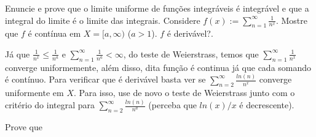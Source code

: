 \documentclass[11pt]{exam}
\begin{document}
\begin{questions}
 \question[20] Enuncie e prove que o limite uniforme de funções integráveis é integrável e que a integral do limite é o limite das integrais.
  \question[20] Considere $f(x):=\sum_{n=1}^{\infty}\frac{1}{n^x}$. Mostre que $f$ é contínua em $X=[a,\infty)$ ($a>1$). $f$ é derivável?.
  \begin{solution}
  Já que $\frac{1}{n^x}\leq \frac{1}{n^a}$ e $\sum_{n=1}^{\infty}\frac{1}{n^a}< \infty$, do teste de Weierstrass, temos que 
  $\sum_{n=1}^{\infty}\frac{1}{n^x}$ converge uniformemente, além disso, dita função é continua
  já que cada somando é contínuo. Para verificar que é derivável basta 
  ver se $\sum_{n=2}^{\infty}\frac{ln(n)}{n^x}$ converge uniformente em $X$. Para isso, use de novo o teste de Weierstrass junto com o critério do integral para $\sum_{n=2}^{\infty}\frac{ln(n)}{n^a}$ (perceba que 
  $ln(x)/x$ é decrescente).
  \end{solution}
 \question Prove que
\end{questions}
\end{document}
